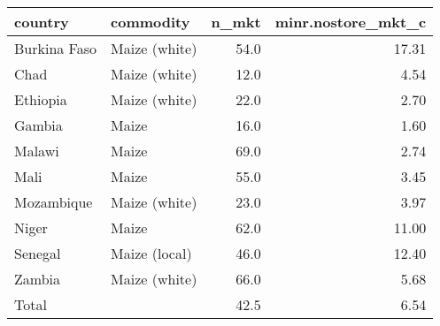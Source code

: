 \begin{table}[ht]
\centering
\begin{tabular}{llrr}
  \hline
country & commodity & n\_mkt & minr.nostore\_mkt\_c \\ 
  \hline
Burkina Faso & Maize (white) & 54.0 & 17.31 \\ 
  Chad & Maize (white) & 12.0 & 4.54 \\ 
  Ethiopia & Maize (white) & 22.0 & 2.70 \\ 
  Gambia & Maize & 16.0 & 1.60 \\ 
  Malawi & Maize & 69.0 & 2.74 \\ 
  Mali & Maize & 55.0 & 3.45 \\ 
  Mozambique & Maize (white) & 23.0 & 3.97 \\ 
  Niger & Maize & 62.0 & 11.00 \\ 
  Senegal & Maize (local) & 46.0 & 12.40 \\ 
  Zambia & Maize (white) & 66.0 & 5.68 \\ 
  Total &  & 42.5 & 6.54 \\ 
   \hline
\end{tabular}
\end{table}
